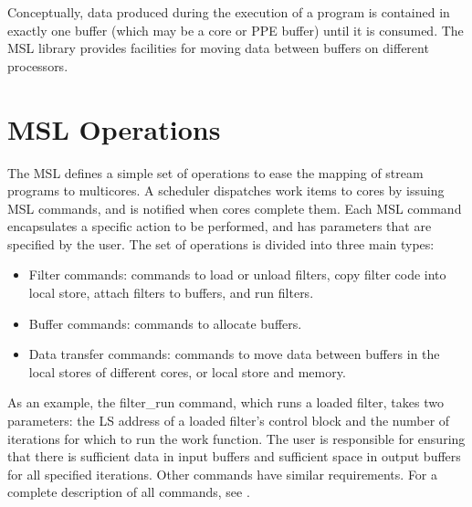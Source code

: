 


Conceptually, data produced during the execution of a program is
contained in exactly one buffer (which may be a core or PPE buffer)
until it is consumed. The MSL library provides facilities for moving
data between buffers on different processors.
 
\section{MSL Operations}

The MSL defines a simple set of operations to ease the mapping of stream
programs to multicores. A scheduler dispatches work items to cores by
issuing MSL commands, and is notified when cores complete
them. Each MSL command encapsulates a specific action to be
performed, and has parameters that are specified by the user. The
set of operations is divided into three main types:
\begin{itemize}
\item Filter commands: commands to load or unload filters, copy filter code into local store, attach filters to buffers, and run filters.
\item Buffer commands: commands to allocate buffers.
\item Data transfer commands: commands to move data between buffers in the local stores of different cores, or local store and memory.
\end{itemize}

As an example, the \textsf{filter\_run} command, which runs a loaded
filter, takes two parameters: the LS address of a loaded filter's
control block and the number of iterations for which to run the work function.
The user is responsible for ensuring that there is sufficient
data in input buffers and sufficient space in output buffers for all
specified iterations. Other commands have similar requirements. For a
complete description of all commands, see \cite{dxzhang-meng-07}.

